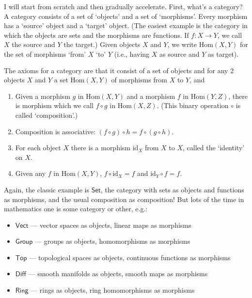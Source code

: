 \documentclass[12pt]{article}
\def\tightlist{}
\begin{document}
I will start from scratch and then gradually accelerate. First, what's a
category? A category consists of a set of `objects' and a set of
`morphisms'. Every morphism has a `source' object and a `target' object.
(The easiest example is the category in which the objects are sets and
the morphisms are functions. If \(f\colon X\to Y\), we call \(X\) the
source and \(Y\) the target.) Given objects \(X\) and \(Y\), we write
\(\mathrm{Hom}(X,Y)\) for the set of morphisms `from' \(X\) `to' \(Y\)
(i.e., having \(X\) as source and \(Y\) as target).

The axioms for a category are that it consist of a set of objects and
for any 2 objects \(X\) and \(Y\) a set \(\mathrm{Hom}(X,Y)\) of
morphisms from \(X\) to \(Y\), and

\begin{enumerate}
\def\labelenumi{\alph{enumi})}
\item
  Given a morphism \(g\) in \(\mathrm{Hom}(X,Y)\) and a morphism \(f\)
  in \(\mathrm{Hom}(Y,Z)\), there is morphism which we call \(f\circ g\)
  in \(\mathrm{Hom}(X,Z)\). (This binary operation \(\circ\) is called
  `composition'.)
\item
  Composition is associative: \((f\circ g)\circ h = f\circ (g\circ h)\).
\item
  For each object \(X\) there is a morphism \(\mathrm{id}_X\) from \(X\)
  to \(X\), called the `identity' on \(X\).
\item
  Given any \(f\) in \(\mathrm{Hom}(X,Y)\),
  \(f \circ \mathrm{id}_X = f\) and \(\mathrm{id}_Y \circ f = f\).
\end{enumerate}

Again, the classic example is \(\mathsf{Set}\), the category with sets
as objects and functions as morphisms, and the usual composition as
composition! But lots of the time in mathematics one is some category or
other, e.g.:

\begin{itemize}
\tightlist
\item
  \(\mathsf{Vect}\) --- vector spaces as objects, linear maps as
  morphisms
\item
  \(\mathsf{Group}\) --- groups as objects, homomorphisms as morphisms
\item
  \(\mathsf{Top}\) --- topological spaces as objects, continuous
  functions as morphisms
\item
  \(\mathsf{Diff}\) --- smooth manifolds as objects, smooth maps as
  morphisms
\item
  \(\mathsf{Ring}\) --- rings as objects, ring homomorphisms as
  morphisms
\end{itemize}
\end{document}
